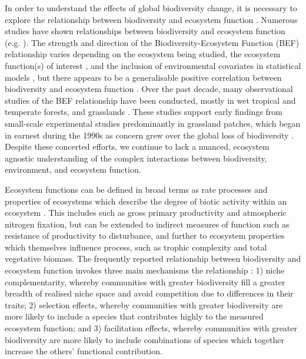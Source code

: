 \documentclass[11pt,a4paper]{article}
\begin{document}
In order to understand the effects of global biodiversity change, it is necessary to explore the relationship between biodiversity and ecosystem function \citep{Tilman2014}. Numerous studies have shown relationships between biodiversity and ecosystem function (e.g. \citealt{Liang2016, Hooper2012, Cardinale2009}). The strength and direction of the Biodiversity-Ecosystem Function (BEF) relationship varies depending on the ecosystem being studied, the ecosystem function(s) of interest \citep{Hector2007}, and the inclusion of environmental covariates in statistical models \citep{Vila2005}, but there appears to be a generalisable positive correlation between biodiversity and ecosystem function \citep{Liang2016}. Over the past decade, many observational studies of the BEF relationship have been conducted, mostly in wet tropical and temperate forests, and grasslands \citep{Chen2011}. These studies support early findings from small-scale experimental studies  predominantly in grassland patches, which began in earnest during the 1990s as concern grew over the global loss of biodiversity \citep{Tilman1994, Tilman2014}. Despite these concerted efforts, we continue to lack a nuanced, ecosystem agnostic understanding of the complex interactions between biodiversity, environment, and ecosystem function.

Ecosystem functions can be defined in broad terms as rate processes and properties of ecosystems which describe the degree of biotic activity within an ecosystem \citep{Jax2005}. This includes  such as gross primary productivity and atmospheric nitrogen fixation, but can be extended to indirect measures of function such as resistance of productivity to disturbance, and further to ecosystem properties which themselves influence process, such as trophic complexity and total vegetative biomass. The frequently reported  relationship between biodiversity and ecosystem function invokes three main mechanisms  the relationship \citep{Tilman2014}: 1) niche complementarity, whereby communities with greater biodiversity fill a greater breadth of realised niche space and avoid competition due to differences in their traits; 2) selection effects, whereby communities with greater biodiversity are more likely to include a species that contributes highly to the measured ecosystem function; and 3) facilitation effects, whereby communities with greater biodiversity are more likely to include combinations of species which together increase the others' functional contribution.
\end{document}
